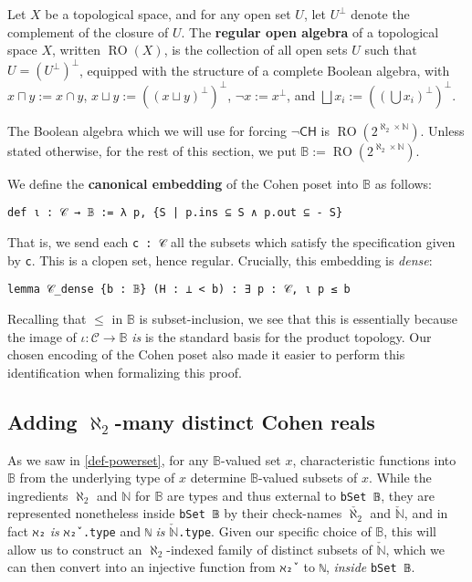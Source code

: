 \documentclass[a4paper,USenglish,cleveref, autoref]{lipics-v2019}
\newcommand{\B}{\mathbb{B}}
\newcommand{\lil}{\lstinline}
\newcommand{\N}{\mathbb{N}}
\begin{document}
\begin{definition}
  Let $X$ be a topological space, and for any open set $U$, let $U^\perp$ denote the complement of the closure of $U$. The \textbf{regular open algebra} of a topological space $X$, written $\operatorname{RO}(X)$, is the collection of all open sets $U$ such that $U = (U^\perp)^\perp$, equipped with the structure of a complete Boolean algebra, with $x \sqcap y := x \cap y$, $x \sqcup y := ((x \sqcup y)^\perp)^\perp$, $\neg x := x^\perp$, and $\bigsqcup x_i := ((\bigcup x_i)^\perp)^\perp$.
\end{definition}

The Boolean algebra which we will use for forcing $\neg\mathsf{CH}$ is $\operatorname{RO}(2^{\aleph_2 \times \mathbb{N}})$. Unless stated otherwise, for the rest of this section, we put $\B := \operatorname{RO}(2^{\aleph_2 \times \mathbb{N}})$.

\begin{definition}
  We define the \textbf{canonical embedding} of the Cohen poset into $\B$ as follows:
  \begin{lstlisting}
def ι : 𝒞 → 𝔹 := λ p, {S | p.ins ⊆ S ∧ p.out ⊆ - S}    
\end{lstlisting}
\end{definition}
That is, we send each \lil{c : 𝒞} all the subsets which satisfy the specification given by \lil{c}. This is a clopen set, hence regular. Crucially, this embedding is \emph{dense}:
\begin{lstlisting}
lemma 𝒞_dense {b : 𝔹} (H : ⊥ < b) : ∃ p : 𝒞, ι p ≤ b  
\end{lstlisting}
Recalling that $\leq$ in $\B$ is subset-inclusion, we see that this is essentially because the image of $\iota : \mathcal{C} \to \B$ \emph{is} is the standard basis for the product topology. Our chosen encoding of the Cohen poset also made it easier to perform this identification when formalizing this proof.
\subsection{Adding $\aleph_2$-many distinct Cohen reals} \label{subsect:cohen-reals}
As we saw in \autoref{def-powerset}, for any $\B$-valued set $x$, characteristic functions into $\B$ from the underlying type of $x$ determine $\B$-valued subsets of $x$. While the ingredients $\aleph_2$ and $\mathbb{N}$ for $\B$ are types and thus external to \lil{bSet 𝔹}, they are represented nonetheless inside \lil{bSet 𝔹} by their check-names $\check{\aleph_2}$ and $\check{\mathbb{N}}$, and in fact \lil{ℵ₂} \emph{is} \lil{ℵ₂̌ .type} and \lil{ℕ} \emph{is} $\check{\mathbb{N}}$\lil{.type}. Given our specific choice of $\B$, this will allow us to construct an $\aleph_2$-indexed family of distinct subsets of $\check{\N}$, which we can then convert into an injective function from \lil{ℵ₂̌ } to \lil{ℕ}, \emph{inside} \lil{bSet 𝔹}.
\end{document}
